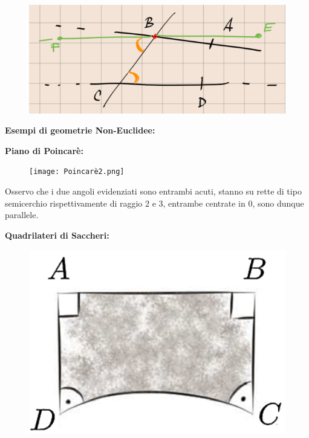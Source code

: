\documentclass[a4paper,10pt]{article}
\theoremstyle{definition}
\theoremstyle{indentdefinition}
\theoremstyle{indentpostulate}
\theoremstyle{indenttheorem}
\theoremstyle{myremark}
\theoremstyle{indentgeneral}
\begin{document}
\begin{figure}[H]
    \centering
    \includegraphics[scale=0.5]{Parallele2.png}
\end{figure}

\textbf{Esempi di geometrie Non-Euclidee:}

\vspace{.5cm}

\textbf{Piano di Poincarè:}

\begin{figure}[H]
    \centering
    \texttt{[image: Poincarè2.png]}
\end{figure}

Osservo che i due angoli evidenziati sono entrambi acuti, stanno su rette di tipo semicerchio rispettivamente di raggio 2 e 3, entrambe centrate in 0, sono dunque parallele.


\textbf{Quadrilateri di Saccheri:}

\begin{figure}[H]
    \centering
    \includegraphics[scale=0.5]{Saccheri1.png}
\end{figure}
\end{document}
